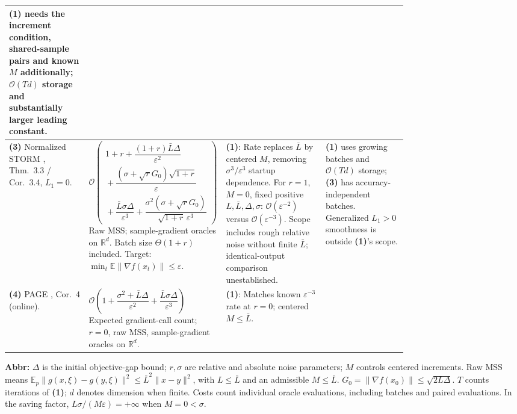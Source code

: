 \begin{table}[tp]
\begin{threeparttable}
\begin{tabularx}{\linewidth}{@{}>{\raggedright\arraybackslash}p{0.20\linewidth}>{\raggedright\arraybackslash}p{0.32\linewidth}>{\raggedright\arraybackslash}p{0.25\linewidth}>{\raggedright\arraybackslash}X@{}}
\textbf{(1)} needs the increment condition, shared-sample pairs and known $M$ additionally; $\mathcal{O}(Td)$ storage and substantially larger leading constant. \\
\midrule
\textbf{(3)} Normalized STORM \citep{mrLiu2023v2}, Thm.~3.3 / Cor.~3.4, $L_1=0$. &
$\mathcal{O}\!\left(\begin{gathered}1+r+\dfrac{(1+r)\bar L\Delta}{\varepsilon^2}\\ {}+\dfrac{(\sigma+\sqrt r G_0)\sqrt{1+r}}{\varepsilon}\\ {}+\dfrac{\bar L\sigma\Delta}{\varepsilon^3}+\dfrac{\sigma^2(\sigma+\sqrt r G_0)}{\sqrt{1+r}\,\varepsilon^3}\end{gathered}\right)$\newline
Raw MSS; sample-gradient oracles on $\mathbb R^d$. Batch size $\Theta(1+r)$ included. Target: $\min_t\mathbb E\|\nabla f(x_t)\|\le\varepsilon$. &
\textbf{(1)}: Rate replaces $\bar L$ by centered $M$, removing $\sigma^3/\varepsilon^3$ startup dependence. For $r=1$, $M=0$, fixed positive $L,\bar L,\Delta,\sigma$: $\mathcal{O}(\varepsilon^{-2})$ versus $\mathcal{O}(\varepsilon^{-3})$. Scope includes rough relative noise without finite $\bar L$; identical-output comparison unestablished. &
\textbf{(1)} uses growing batches and $\mathcal{O}(Td)$ storage; \textbf{(3)} has accuracy-independent batches. Generalized $L_1>0$ smoothness is outside \textbf{(1)}'s scope. \\
\midrule
\textbf{(4)} PAGE \citep{fsncLi2021PAGE}, Cor.~4 (online). &
$\mathcal{O}\!\left(1+\dfrac{\sigma^2+\bar L\Delta}{\varepsilon^2}+\dfrac{\bar L\sigma\Delta}{\varepsilon^3}\right)$\newline
Expected gradient-call count; $r=0$, raw MSS, sample-gradient oracles on $\mathbb R^d$. &
\textbf{(1)}: Matches known $\varepsilon^{-3}$ rate at $r=0$; centered $M\le\bar L$. & \\
\bottomrule
\end{tabularx}
\begin{tablenotes}[flushleft]\footnotesize
\item[] \textbf{Abbr:} $\Delta$ is the initial objective-gap bound; $r,\sigma$ are relative and absolute noise parameters; $M$ controls centered increments. Raw MSS means $\mathbb E_p\|g(x,\xi)-g(y,\xi)\|^2\le\bar L^2\|x-y\|^2$, with $L\le\bar L$ and an admissible $M\le\bar L$. $G_0=\|\nabla f(x_0)\|\le\sqrt{2L\Delta}$. $T$ counts iterations of \textbf{(1)}; $d$ denotes dimension when finite. Costs count individual oracle evaluations, including batches and paired evaluations. In the saving factor, $L\sigma/(M\varepsilon)=+\infty$ when $M=0<\sigma$.
\end{tablenotes}
\end{threeparttable}
\end{table}
\clearpage
